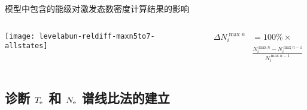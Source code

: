 \begin{CJK*}{UTF8}{kai}
\begin{frame}{模型中包含的能级对激发态数密度计算结果的影响}%
		\begin{columns}[T]
	\vspace{-0.7cm}
	\begin{center}
		\texttt{[image: levelabun-reldiff-maxn5to7-allstates]}
	\end{center}
	
	\begin{align*}
	   \Delta N_i^{\max n} & = 100\% \times \\
    	 & \frac{N_i^{\max n}-N_i^{\max n-1}}{N_i^{\max n-1}}
	\end{align*}
    \vspace{1em}
	\end{columns}
\end{frame}

%

\subsection{诊断 $T_{\rm e}$ 和 $N_{\rm e}$ 谱线比法的建立}


\end{CJK*}
